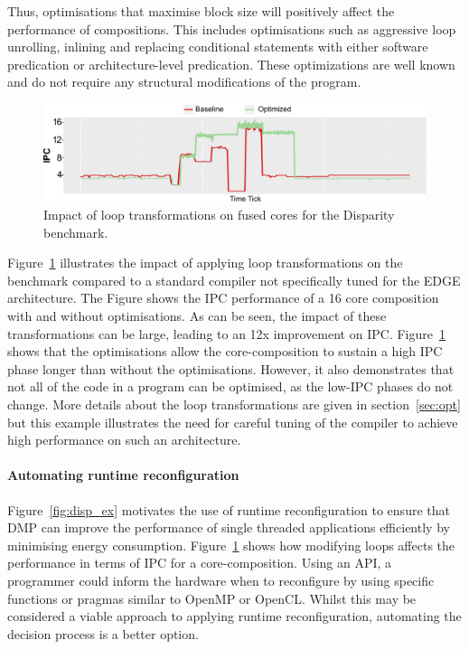 Thus, optimisations that maximise block size will positively affect the performance of compositions.
This includes optimisations such as aggressive loop unrolling, inlining and replacing conditional statements with either software predication or architecture-level predication.
These optimizations are well known and do not require any structural modifications of the program.

\begin{figure}[t]
    \includegraphics[width=\textwidth]{cases-paper/graphics/motivation/code_opt_3.pdf}
    \caption{Impact of loop transformations on fused cores for the Disparity benchmark.} 
    \label{fig:compmotiv}
\vspace{1em}
\end{figure}

Figure~\ref{fig:compmotiv} illustrates the impact of applying loop transformations on the  benchmark compared to a standard compiler not specifically tuned for the EDGE architecture.
The Figure shows the IPC performance of a 16 core composition with and without optimisations.
As can be seen, the impact of these transformations can be large, leading to an 12x improvement on IPC.
Figure~\ref{fig:compmotiv} shows that the optimisations allow the core-composition to sustain a high IPC phase longer than without the optimisations.
However, it also demonstrates that not all of the code in a program can be optimised, as the low-IPC phases do not change.
More details about the loop transformations are given in section~\ref{sec:opt} but this example illustrates the need for careful tuning of the compiler to achieve high performance on such an architecture.

\paragraph{Automating runtime reconfiguration}

Figure~\ref{fig:disp_ex} motivates the use of runtime reconfiguration to ensure that DMP can improve the performance of single threaded applications efficiently by minimising energy consumption.
Figure~\ref{fig:compmotiv} shows how modifying loops affects the performance in terms of IPC for a core-composition.
Using an API, a programmer could inform the hardware when to reconfigure by using specific functions or pragmas similar to OpenMP or OpenCL.
Whilst this may be considered a viable approach to applying runtime reconfiguration, automating the decision process is a better option.


